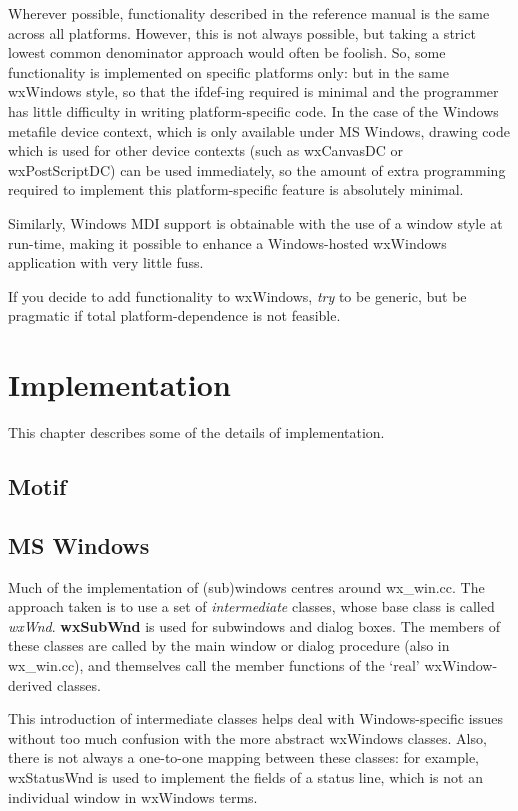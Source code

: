 Wherever possible, functionality described in the reference manual is the same
across all platforms. However, this is not always possible, but taking a strict lowest
common denominator approach would often be foolish. So, some functionality is
implemented on specific platforms only: but in the same wxWindows style, so that
the ifdef-ing required is minimal and the programmer has little difficulty
in writing platform-specific code. In the case of the Windows metafile device context,
which is only available under MS Windows, drawing code which is used for other device contexts
(such as wxCanvasDC or wxPostScriptDC) can be used immediately, so the amount
of extra programming required to implement this platform-specific feature is absolutely
minimal.

Similarly, Windows MDI support is obtainable with the use of a window style at run-time,
making it possible to enhance a Windows-hosted wxWindows application with very little fuss.

If you decide to add functionality to wxWindows, {\it try} to be generic, but be pragmatic
if total platform-dependence is not feasible.

\chapter{Implementation}

This chapter describes some of the details of implementation.

\section{Motif}

\section{MS Windows}

Much of the implementation of (sub)windows centres
around wx\_win.cc. The approach taken is to use a set of {\it intermediate} classes,
whose base class is called {\it wxWnd}. {\bf wxSubWnd} is used for subwindows
and dialog boxes. The members of these classes are called by the main
window or dialog procedure (also in wx\_win.cc), and themselves call
the member functions of the `real' wxWindow-derived classes.

This introduction of intermediate classes helps deal with Windows-specific
issues without too much confusion with the more abstract wxWindows classes. Also,
there is not always a one-to-one mapping between these classes: for example,
wxStatusWnd is used to implement the fields of a status line, which is
not an individual window in wxWindows terms.

